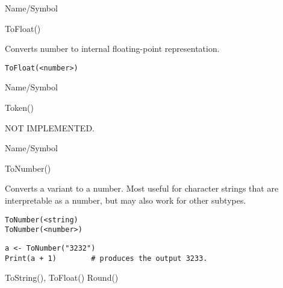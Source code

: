 \rl


\begin{desc}{Name/Symbol}
\item[Name/Symbol]  	ToFloat()

\item[Description] 	Converts number to internal floating-point representation.

\item[Usage]
\begin{verbatim}
ToFloat(<number>)
\end{verbatim}

\item[Example]	

\item[See Also]	
\end{desc}

\rl


\begin{desc}{Name/Symbol}
\item[Name/Symbol]  	Token()

\item[Description]  	NOT IMPLEMENTED.

\item[Usage]		

\item[Example]	

\item[See Also]	
\end{desc}

\rl


\begin{desc}{Name/Symbol}
\item[Name/Symbol]  	ToNumber()

\item[Description]  	Converts a variant to a number. Most useful for character 
			strings that are interpretable as a number, but may also work 
			for other subtypes.

\item[Usage]     
\begin{verbatim}
ToNumber(<string)
ToNumber(<number>)
\end{verbatim}

\item[Example]
\begin{verbatim}
a <- ToNumber("3232")
Print(a + 1)		# produces the output 3233. 
\end{verbatim}

\item[See Also]     	ToString(), ToFloat() Round()
\end{desc}

